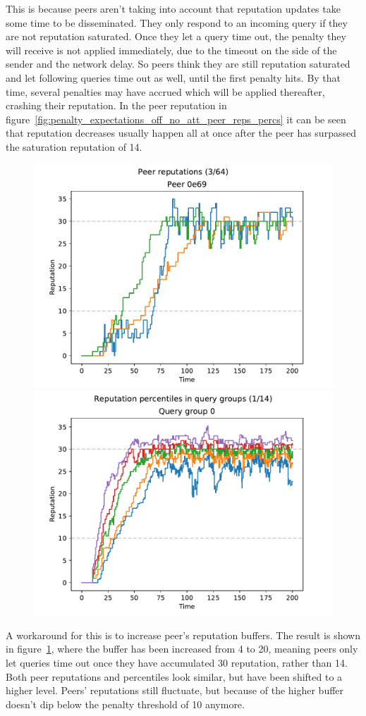 This is because peers aren't taking into account that reputation updates take
some time to be disseminated. They only respond to an incoming query if they are
not reputation saturated. Once they let a query time out, the penalty they will
receive is not applied immediately, due to the timeout on the side of the sender
and the network delay. So peers think they are still reputation saturated and
let following queries time out as well, until the first penalty hits. By that
time, several penalties may have accrued which will be applied thereafter,
crashing their reputation. In the peer reputation in
figure~\ref{fig:penalty_expectations_off_no_att_peer_reps_percs} it can be seen
that reputation decreases usually happen all at once after the peer has
surpassed the saturation reputation of 14.

\begin{figure}[t]
\centering
\includegraphics[width=0.5\columnwidth]{figures/expectations_off_no_att_high_buf_peer_reps_3_of_64}%
\includegraphics[width=0.5\columnwidth]{figures/expectations_off_no_att_high_buf_rep_percs_1_of_14}
\label{fig:penalty_expectations_off_no_att_high_buf_peer_reps_percs}
\end{figure}

A workaround for this is to increase peer's reputation buffers. The result is
shown in
figure~\ref{fig:penalty_expectations_off_no_att_high_buf_peer_reps_percs}, where
the buffer has been increased from 4 to 20, meaning peers only let queries time
out once they have accumulated 30 reputation, rather than 14. Both peer
reputations and percentiles look similar, but have been shifted to a higher
level. Peers' reputations still fluctuate, but because of the higher buffer
doesn't dip below the penalty threshold of 10 anymore.

